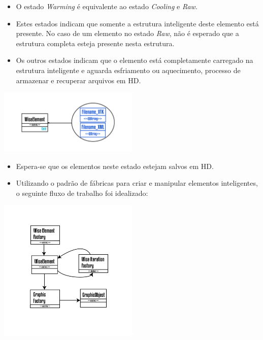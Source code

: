 \documentclass[10pt]{beamer}
\theoremstyle{remark}
\theoremstyle{definition}
\begin{document}
\begin{frame}[allowframebreaks]
		\begin{itemize}
			\item O estado \textit{Warming} é equivalente ao estado \textit{Cooling} e \textit{Raw}.
			\item Estes estados indicam que somente a estrutura inteligente deste elemento está presente. No caso de um elemento no estado \textit{Raw}, não é esperado que a estrutura completa esteja presente nesta estrutura.
			\item Os outros estados indicam que o elemento está completamente carregado na estrutura inteligente e aguarda esfriamento ou aquecimento, processo de armazenar e recuperar arquivos em HD.
		\end{itemize}
		
		\framebreak
		
		\begin{center}
			\includegraphics[width=0.5\textwidth]{images/WiseElementCold.png}
		\end{center}
		
		\begin{itemize}
			\item Espera-se que os elementos neste estado estejam salvos em HD.
		\end{itemize}
		
		\framebreak
		
		\begin{itemize}
			\item Utilizando o padrão de fábricas para criar e manipular elementos inteligentes, o seguinte fluxo de trabalho foi idealizado:
		\end{itemize}
		\begin{flushright}
			
			\item \includegraphics[width=0.5\textwidth]{images/WiseElementWorkflow.png}
			

\end{flushright}
\end{frame}
\end{document}
